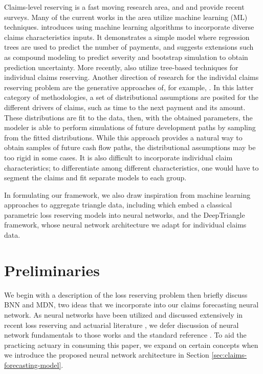 \documentclass{article}
\begin{document}
Claims-level reserving is a fast moving research area, and \cite{boumezoued2017individual} and \cite{taylor2019loss} provide recent surveys. Many of the current works in the area utilize machine learning (ML) techniques. \cite{wuthrich2018machine} introduces using machine learning algorithms to incorporate diverse claims characteristics inputs. It demonstrates a simple model where regression trees are used to predict the number of payments, and suggests extensions such as compound modeling to predict severity and bootstrap simulation to obtain prediction uncertainty. More recently,  \cite{duval2019individual, lopez2019tree, baudrymachine} also utilize tree-based techniques for individual claims reserving. Another direction of research for the individal claims reserving problem are the generative approaches of, for example, \cite{antonio2014micro, pigeon2013individual, pigeon2014individual}. In this latter category of methodologies, a set of distributional assumptions are posited for the different drivers of claims, such as time to the next payment and its amount. These distributions are fit to the data, then, with the obtained parameters, the modeler is able to perform simulations of future development paths by sampling from the fitted distributions. While this approach provides a natural way to obtain samples of future cash flow paths, the distributional assumptions may be too rigid in some cases. It is also difficult to incorporate individual claim characteristics; to differentiate among different characteristics, one would have to segment the claims and fit separate models to each group.

In formulating our framework, we also draw inspiration from machine learning approaches to aggregate triangle data, including \cite{gabrielli2018neural, gabrielli2019neural} which embed a classical parametric loss reserving models into neural networks, and the DeepTriangle \cite{kuo2018deeptriangle} framework, whose neural network architecture we adapt for individual claims data.

\section{Preliminaries}

We begin with a description of the loss reserving problem then briefly discuss BNN and MDN, two ideas that we incorporate into our claims forecasting neural network. As neural networks have been utilized and discussed extensively in recent loss reserving and actuarial literature \cite{gabrielli2018neural, kuo2018deeptriangle, gabrielli2018individual, richman2018neural}, we defer discussion of neural network fundamentals to those works and the standard reference \cite{Goodfellow-et-al-2016}. To aid the practicing actuary in consuming this paper, we expand on certain concepts when we introduce the proposed neural network architecture in Section \ref{sec:claims-forecasting-model}.
\end{document}
